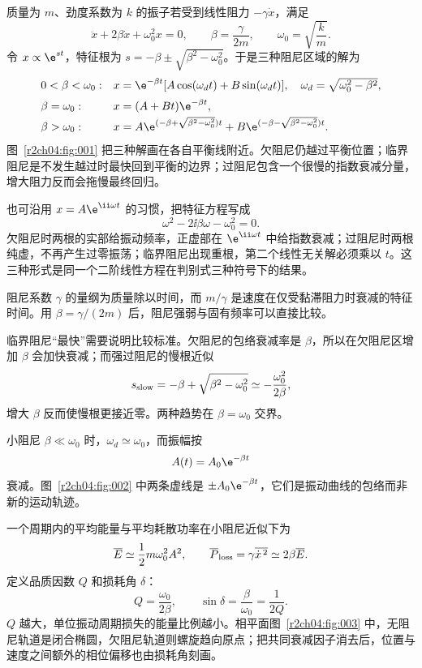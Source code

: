 质量为 $m$、劲度系数为 $k$ 的振子若受到线性阻力 $-\gamma\dot x$，满足
\begin{equation}
 \ddot x+2\beta\dot x+\omega_0^2x=0,
 \qquad
 \beta=\frac{\gamma}{2m},\qquad \omega_0=\sqrt{\frac km}.
 \label{r2ch04:eq:010}
\end{equation}
令 $x\propto\e^{st}$，特征根为 $s=-\beta\pm\sqrt{\beta^2-\omega_0^2}$。于是三种阻尼区域的解为
\begin{equation}
 \begin{array}{ll}
 0<\beta<\omega_0:&x=\e^{-\beta t}[A\cos(\omega_dt)+B\sin(\omega_dt)],\quad
 \omega_d=\sqrt{\omega_0^2-\beta^2},\\[2mm]
 \beta=\omega_0:&x=(A+Bt)\e^{-\beta t},\\[1mm]
 \beta>\omega_0:&x=A\e^{(-\beta+\sqrt{\beta^2-\omega_0^2})t}
 +B\e^{(-\beta-\sqrt{\beta^2-\omega_0^2})t}.
 \end{array}
 \label{r2ch04:eq:011}
\end{equation}
图~\ref{r2ch04:fig:001} 把三种解画在各自平衡线附近。欠阻尼仍越过平衡位置；临界阻尼是不发生越过时最快回到平衡的边界；过阻尼包含一个很慢的指数衰减分量，增大阻力反而会拖慢最终回归。

也可沿用 $x=A\e^{\ii\omega t}$ 的习惯，把特征方程写成
\[
 \omega^2-2\ii\beta\omega-\omega_0^2=0.
\]
欠阻尼时两根的实部给振动频率，正虚部在 $\e^{\ii\omega t}$ 中给指数衰减；过阻尼时两根纯虚，不再产生过零振荡；临界阻尼出现重根，第二个线性无关解必须乘以 $t$。这三种形式是同一个二阶线性方程在判别式三种符号下的结果。

阻尼系数 $\gamma$ 的量纲为质量除以时间，而 $m/\gamma$ 是速度在仅受黏滞阻力时衰减的特征时间。用 $\beta=\gamma/(2m)$ 后，阻尼强弱与固有频率可以直接比较。

临界阻尼“最快”需要说明比较标准。欠阻尼的包络衰减率是 $\beta$，所以在欠阻尼区增加 $\beta$ 会加快衰减；而强过阻尼的慢根近似
\[
 s_{\rm slow}=-\beta+\sqrt{\beta^2-\omega_0^2}
 \simeq-\frac{\omega_0^2}{2\beta},
\]
增大 $\beta$ 反而使慢根更接近零。两种趋势在 $\beta=\omega_0$ 交界。
\figDampingRegimes

小阻尼 $\beta\ll\omega_0$ 时，$\omega_d\simeq\omega_0$，而振幅按
\begin{equation}
 A(t)=A_0\e^{-\beta t}
 \label{r2ch04:eq:012}
\end{equation}
衰减。图~\ref{r2ch04:fig:002} 中两条虚线是 $\pm A_0\e^{-\beta t}$，它们是振动曲线的包络而非新的运动轨迹。
\figDampedEnvelope

一个周期内的平均能量与平均耗散功率在小阻尼近似下为
\begin{equation}
 \overline E\simeq\frac12m\omega_0^2A^2,\qquad
 \overline P_{\rm loss}=\gamma\overline{\dot x^{\,2}}\simeq2\beta\overline E.
 \label{r2ch04:eq:013}
\end{equation}
定义品质因数 $Q$ 和损耗角 $\delta$：
\begin{equation}
 Q=\frac{\omega_0}{2\beta},\qquad
 \sin\delta=\frac{\beta}{\omega_0}=\frac1{2Q}.
 \label{r2ch04:eq:014}
\end{equation}
$Q$ 越大，单位振动周期损失的能量比例越小。相平面图~\ref{r2ch04:fig:003} 中，无阻尼轨道是闭合椭圆，欠阻尼轨道则螺旋趋向原点；把共同衰减因子消去后，位置与速度之间额外的相位偏移也由损耗角刻画。

